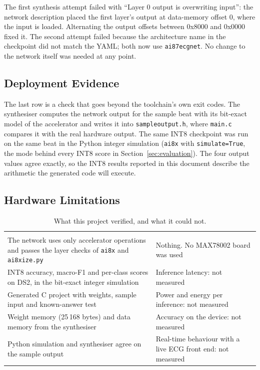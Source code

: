 The first synthesis attempt failed with ``Layer 0 output is overwriting input'': the network description placed the first layer's output at data-memory offset 0, where the input is loaded. Alternating the output offsets between 0x8000 and 0x0000 fixed it. The second attempt failed because the architecture name in the checkpoint did not match the YAML; both now use \texttt{ai87ecgnet}. No change to the network itself was needed at any point.

\subsection{Deployment Evidence}
\label{sec:evidence}



The last row is a check that goes beyond the toolchain's own exit codes. The synthesiser computes the network output for the sample beat with its bit-exact model of the accelerator and writes it into \texttt{sampleoutput.h}, where \texttt{main.c} compares it with the real hardware output. The same INT8 checkpoint was run on the same beat in the Python integer simulation (\texttt{ai8x} with \texttt{simulate=True}, the mode behind every INT8 score in Section~\ref{sec:evaluation}). The four output values agree exactly, so the INT8 results reported in this document describe the arithmetic the generated code will execute.

\subsection{Hardware Limitations}
\label{sec:hardware-limitations}

\begin{table}[H]
  \centering
  \caption{What this project verified, and what it could not.}
  \label{tab:verified}
  \begin{tabularx}{\linewidth}{Y Y}
     &  \\
    The network uses only accelerator operations and passes the layer checks of \texttt{ai8x} and \texttt{ai8xize.py} & Nothing. No MAX78002 board was used \\
    INT8 accuracy, macro-F1 and per-class scores on DS2, in the bit-exact integer simulation & Inference latency: not measured \\
    Generated C project with weights, sample input and known-answer test & Power and energy per inference: not measured \\
    Weight memory (25\,168 bytes) and data memory from the synthesiser & Accuracy on the device: not measured \\
    Python simulation and synthesiser agree on the sample output & Real-time behaviour with a live ECG front end: not measured \\
    \bottomrule
  \end{tabularx}
\end{table}


